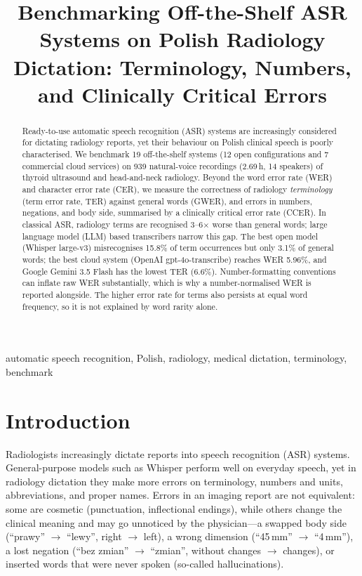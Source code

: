 \documentclass[conference]{IEEEtran}
\title{Benchmarking Off-the-Shelf ASR Systems on Polish Radiology Dictation: Terminology, Numbers, and Clinically Critical Errors}
\author{\IEEEauthorblockN{Konrad Strojny}\IEEEauthorblockA{Email: \texttt{konrad.j.strojny@gmail.com}}}
\begin{document}
\maketitle

\begin{abstract}
Ready-to-use automatic speech recognition (ASR) systems are increasingly considered for dictating radiology reports, yet their behaviour on Polish clinical speech is poorly characterised. We benchmark 19 off-the-shelf systems (12 open configurations and 7 commercial cloud services) on 939 natural-voice recordings (2.69\,h, 14 speakers) of thyroid ultrasound and head-and-neck radiology. Beyond the word error rate (WER) and character error rate (CER), we measure the correctness of radiology \emph{terminology} (term error rate, TER) against general words (GWER), and errors in numbers, negations, and body side, summarised by a clinically critical error rate (CCER). In classical ASR, radiology terms are recognised 3--6$\times$ worse than general words; large language model (LLM) based transcribers narrow this gap. The best open model (Whisper large-v3) misrecognises 15.8\% of term occurrences but only 3.1\% of general words; the best cloud system (OpenAI gpt-4o-transcribe) reaches WER 5.96\%, and Google Gemini 3.5 Flash has the lowest TER (6.6\%). Number-formatting conventions can inflate raw WER substantially, which is why a number-normalised WER is reported alongside. The higher error rate for terms also persists at equal word frequency, so it is not explained by word rarity alone.
\end{abstract}

\begin{IEEEkeywords}
automatic speech recognition, Polish, radiology, medical dictation, terminology, benchmark
\end{IEEEkeywords}

\section{Introduction}
Radiologists increasingly dictate reports into speech recognition (ASR) systems. General-purpose models such as Whisper perform well on everyday speech, yet in radiology dictation they make more errors on terminology, numbers and units, abbreviations, and proper names. Errors in an imaging report are not equivalent: some are cosmetic (punctuation, inflectional endings), while others change the clinical meaning and may go unnoticed by the physician---a swapped body side (``prawy'' $\to$ ``lewy'', right $\to$ left), a wrong dimension (``45\,mm'' $\to$ ``4\,mm''), a lost negation (``bez zmian'' $\to$ ``zmian'', without changes $\to$ changes), or inserted words that were never spoken (so-called hallucinations).
\end{document}
